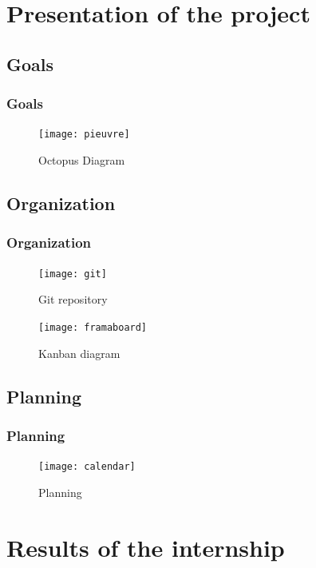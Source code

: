 \documentclass[10pt, svgnames, compress, red]{beamer}
\begin{document}

\section{Presentation of the project}

\subsection{Goals}
\begin{frame}
  \frametitle{Goals}
  \begin{figure}[h]
    \centering
    \texttt{[image: pieuvre]}
    \caption{Octopus Diagram}
  \end{figure}
  \transdissolve[duration=0.1]
\end{frame}

\subsection{Organization}
\begin{frame}
  \frametitle{Organization}
  \begin{figure}
    \begin{minipage}[h]{0.45\linewidth}
      \texttt{[image: git]}
      \caption{Git repository}
    \end{minipage}
    \hfill
    \begin{minipage}[h]{0.45\linewidth}
      \texttt{[image: framaboard]}
      \caption{Kanban diagram}
    \end{minipage}
  \end{figure}
  \transdissolve[duration=0.1]
\end{frame}

\subsection{Planning}
\begin{frame}
  \frametitle{Planning}
  \begin{figure}[h]
    \centering
    \texttt{[image: calendar]}
    \caption{Planning}
  \end{figure}

  \transdissolve[duration=0.1]
\end{frame}


\section{Results of the internship}
\end{document}
